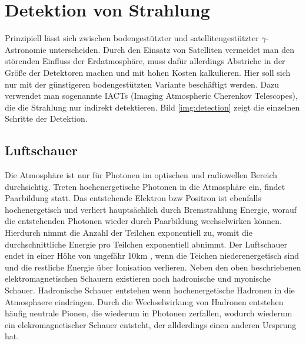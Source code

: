 \section{Detektion von Strahlung}
Prinzipiell lässt sich zwischen bodengestützter und satellitengestützter $\gamma$-Astronomie unterscheiden. Durch den Einsatz von Satelliten vermeidet man den störenden Einfluss der Erdatmosphäre, muss dafür allerdings Abstriche in der Größe der Detektoren machen und mit hohen Kosten kalkulieren. Hier soll sich nur mit der günstigeren bodengestützten Variante beschäftigt werden. Dazu verwendet man sogenannte IACTs (Imaging Atmospheric Cherenkov Telescopes), die die Strahlung nur indirekt detektieren. Bild \ref{img:detection} zeigt die einzelnen Schritte der Detektion.

\subsection{Luftschauer}
Die Atmosphäre ist nur für Photonen im optischen und radiowellen Bereich durchsichtig. Treten hochenergetische Photonen in die Atmosphäre ein, findet Paarbildung statt. Das entstehende Elektron bzw Positron ist ebenfalls hochenergetisch und verliert hauptsächlich durch Bremstrahlung Energie, worauf die entstehenden Photonen wieder durch Paarbildung wechselwirken können. Hierdurch nimmt die Anzahl der Teilchen exponentiell zu, womit die durchschnittliche Energie pro Teilchen exponentiell abnimmt. Der Luftschauer endet in einer Höhe von ungefähr 10km 
\cite{iwas}, wenn die Teichen niederenergetisch sind und die restliche Energie über Ionisation verlieren.
Neben den oben beschriebenen elektromagnetischen Schauern existieren noch hadronische und myonische Schauer. Hadronische Schauer entstehen wenn hochenergetische Hadronen in die Atmosphaere eindringen. Durch die Wechselwirkung von Hadronen entstehen häufig neutrale Pionen, die wiederum in Photonen zerfallen, wodurch wiederum ein elekromagnetischer Schauer entsteht, der allderdings einen anderen Ursprung hat. %

